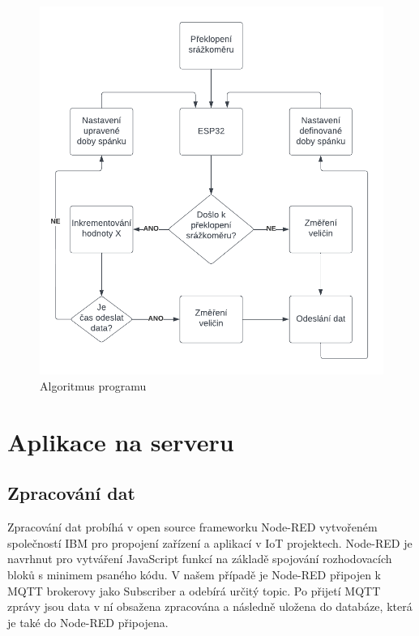     \begin{figure}[!h]
      \begin{center}
        \includegraphics[scale=1]{obrazky/prace/SoftwareDiagram.pdf}
      \end{center}
      \caption[Algoritmus]{Algoritmus programu}
      \label{obr:Software}
    \end{figure}

\section{Aplikace na serveru}
\subsection{Zpracování dat}
\par Zpracování dat probíhá v open source frameworku Node-RED vytvořeném společností IBM pro propojení zařízení a aplikací v IoT projektech. Node-RED je navrhnut pro vytváření JavaScript funkcí na základě spojování rozhodovacích bloků s minimem psaného kódu. V našem případě je Node-RED připojen k MQTT brokerovy jako Subscriber a odebírá určitý topic. Po přijetí MQTT zprávy jsou data v ní obsažena zpracována a následně uložena do databáze, která je také do Node-RED připojena.

